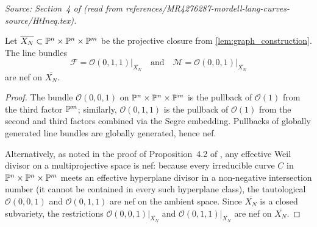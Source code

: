 \begin{lemma}
  \label{lem:nefFromBetti}
  \textit{Source: Section~4 of \cite{MR4276287-mordell-lang-curves}
  (read from references/MR4276287-mordell-lang-curves-source/HtIneq.tex).}

  Let \(\overline{X_N} \subset \mathbb{P}^n \times \mathbb{P}^n \times \mathbb{P}^m\) be the
  projective closure from \cref{lem:graph_construction}.  The line bundles
  \[
    \mathcal{F} = \mathcal{O}(0,1,1)\big|_{\overline{X_N}}
    \quad \text{and} \quad
    \mathcal{M} = \mathcal{O}(0,0,1)\big|_{\overline{X_N}}
  \]
  are nef on \(\overline{X_N}\).
\end{lemma}

\begin{proof}
  The bundle \(\mathcal{O}(0,0,1)\) on \(\mathbb{P}^n \times \mathbb{P}^n \times \mathbb{P}^m\) is
  the pullback of \(\mathcal{O}(1)\) from the third factor \(\mathbb{P}^m\); similarly,
  \(\mathcal{O}(0,1,1)\) is the pullback of \(\mathcal{O}(1)\) from the second and
  third factors combined via the Segre embedding.  Pullbacks of globally generated
  line bundles are globally generated, hence nef.

  Alternatively, as noted in the proof of Proposition~4.2 of
  \cite{MR4276287-mordell-lang-curves}, any effective Weil divisor on a
  multiprojective space is nef: because every irreducible curve \(C\) in
  \(\mathbb{P}^n \times \mathbb{P}^n \times \mathbb{P}^m\) meets an effective hyperplane divisor
  in a non-negative intersection number (it cannot be contained in every
  such hyperplane class), the tautological \(\mathcal{O}(0,0,1)\) and
  \(\mathcal{O}(0,1,1)\) are nef on the ambient space.  Since \(\overline{X_N}\)
  is a closed subvariety, the restrictions
  \(\mathcal{O}(0,0,1)|_{\overline{X_N}}\) and
  \(\mathcal{O}(0,1,1)|_{\overline{X_N}}\) are nef on \(\overline{X_N}\).
\end{proof}
